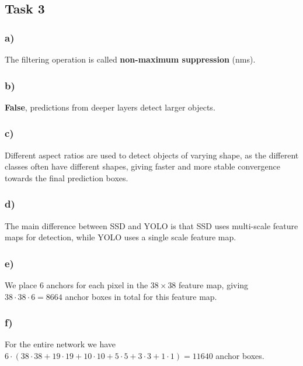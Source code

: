 \subsection*{Task 3}

\subsubsection*{a)}

The filtering operation is called \textbf{non-maximum suppression} (nms).

\subsubsection*{b)}

\textbf{False}, predictions from deeper layers detect larger objects.

\subsubsection*{c)}

Different aspect ratios are used to detect objects of varying shape, as the different classes often have different shapes, giving faster and more stable convergence towards the final prediction boxes.

\subsubsection*{d)}

The main difference between SSD and YOLO is that SSD uses multi-scale feature maps for detection, while YOLO uses a single scale feature map.

\subsubsection*{e)}

We place 6 anchors for each pixel in the $38\times38$ feature map, giving $38\cdot38\cdot6=8664$ anchor boxes in total for this feature map.

\subsubsection*{f)}

For the entire network we have $6\cdot(38\cdot38 + 19\cdot19 + 10\cdot10 + 5\cdot5 + 3\cdot3 + 1\cdot1)=11640$ anchor boxes.
